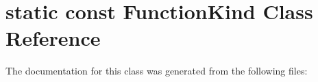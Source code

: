 \hypertarget{classstatic_01const_01FunctionKind}{}\section{static const Function\+Kind Class Reference}
\label{classstatic_01const_01FunctionKind}


The documentation for this class was generated from the following files\+:
